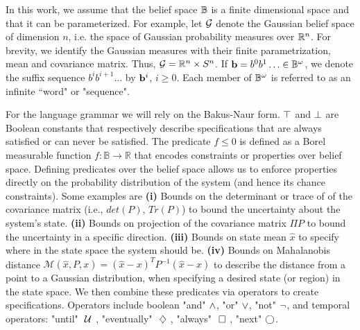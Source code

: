 \documentclass[conference]{IEEEtran}
\begin{document}
    In this work, we assume that the belief space $\mathbb{B}$ is  a finite dimensional space and that it can be parameterized. For example, let $\mathcal{G}$ denote the Gaussian belief space
    of dimension $n$, i.e. the space of Gaussian
    probability measures over $\mathbb{R}^n$.
    For brevity, we identify the Gaussian measures
    with their finite parametrization, mean and
    covariance matrix. Thus,
    $\mathcal{G} =  \mathbb{R}^n \times  S^n$.
    If $\mathbf{b} = b^0b^1 \ldots \in \mathbb{B}^{\omega}$,
    we denote the suffix sequence $b^i b^{i+1} \ldots$ by
    $\mathbf{b}^i$, $i \geq 0$.
    Each member of $\mathbb{B}^\omega$ is referred to as an infinite ``word" or "sequence".
    
    For the language grammar we will rely on the Bakus-Naur form. $\top$ and $\perp$ are Boolean constants that respectively describe specifications that are always satisfied or can never be satisfied. 
    The predicate $f\leq 0$ is defined as a Borel measurable function $f:\mathbb{B}\rightarrow \mathbb{R}$ that encodes constraints or properties over belief space. Defining predicates over the belief space allows us to enforce properties directly on the probability distribution of the system (and hence its chance constraints). Some examples are \textbf{(i)} Bounds on the determinant or trace of of the covariance matrix (i.e., $det(P)$, $Tr(P)$) to  bound the uncertainty about the system's state. \textbf{(ii)} Bounds on projection of the covariance matrix $\Pi P$ to bound the uncertainty in a specific direction.
%
%
    \textbf{(iii)} Bounds on state mean $\hat{x}$ to specify
    where in the state space the system should be. \textbf{(iv)} Bounds on Mahalanobis distance $\mathcal{M}(\hat{x},P,x) = (\hat{x}-x)^TP^{-1}(\hat{x}-x)$
    to describe the distance from a point to a Gaussian distribution, when specifying a desired state (or region) in the state space. We then combine these predicates via operators to create specifications. Operators include boolean "and" $\wedge$, "or" $\vee$, "not" $\neg$, and temporal operators: "until" $\ \mathcal{U}\ $, "eventually" $\ \diamondsuit\ $, "always" $\ \square\ $, "next" $\bigcirc$.
    
    
\end{document}
